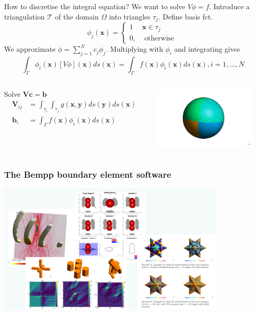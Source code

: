 \documentclass[dvipsnames,10pt]{beamer}
\def\bx{\mathbf{x}}
\def\by{\mathbf{y}}
\begin{document}
\begin{frame}{How to discretise the integral equation?}
We want to solve $V\phi = f$. Introduce a triangulation $\mathcal{T}$ of the domain $\Omega$ into triangles $\tau_j$. Define basis fct.
$$
\phi_j(\bx) = \left\{\begin{array}{cc} 1 & \bx \in \tau_j\\ 0, & \text{ otherwise }\end{array}\right.
$$
We approximate $\phi = \sum_{j=1}^Nc_j\phi_j$. Multiplying with $\phi_i$ and integrating gives
$$
\int_{\Gamma}\phi_i(\bx)\left[V\phi\right](\bx)ds(\bx) = \int_{\Gamma}f(\bx)\phi_i(\bx)ds(\bx), i=1, \dots, N
$$
\begin{columns}[T]
\begin{column}{0.48\textwidth}
Solve $\mathbf{V}\mathbf{c} = \mathbf{b}$
\begin{align}
\mathbf{V}_{ij} &= \int_{\tau_i}\int_{\tau_j} g(\bx, \by)ds(\by) ds(\bx)\nonumber\\
\mathbf{b}_i &= \int_{\Gamma}f(\bx)\phi_i(\bx)ds(\bx)\nonumber
\end{align}
\end{column}
 \begin{column}{0.48\textwidth}
\vspace{-.5cm}
 \begin{center}
\includegraphics[width=5cm]{../figs/sphere.pdf}
\end{center}
 \end{column}
 \end{columns}  
\end{frame}


	
\begin{frame} 
	\frametitle{The Bempp boundary element software}

\begin{center}
\includegraphics[width=11cm]{../figs/applications}
\end{center}

\end{frame}
\end{document}
